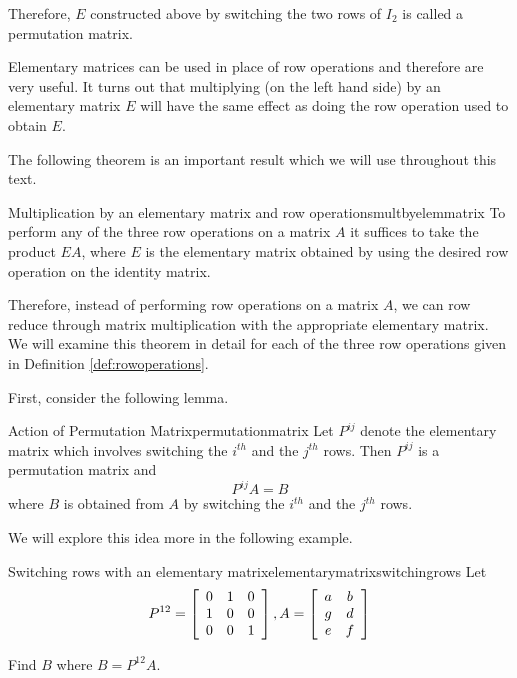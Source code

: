 Therefore, $E$ constructed above by switching the two rows of $I_2$ is called a permutation matrix. 

Elementary matrices can be used in place of row operations and therefore are very useful. It turns
out that multiplying (on the left hand side) by an elementary matrix $E$ will have the
same effect as doing the row operation used to obtain $E$.

The following theorem is an important result which we will use throughout this text. 

\begin{theorem}{Multiplication by an elementary matrix and row operations}{multbyelemmatrix}
To perform any of the three row operations on a matrix $A$
it suffices to take the product $EA$, where $E$ is the elementary matrix obtained by 
using the desired row operation on the identity matrix.
\end{theorem}

Therefore, instead of performing row operations on a matrix $A$, we
can row reduce through matrix multiplication with the appropriate
elementary matrix. We will examine this theorem in detail for each of
the three row operations given in Definition \ref{def:rowoperations}.

First, consider the following lemma.

\begin{lemma}{Action of Permutation Matrix}{permutationmatrix}
Let $P^{ij}$ denote the elementary matrix which involves
switching the $i^{th}$ and the $j^{th}$ rows. Then $P^{ij}$ is a permutation matrix and 
\begin{equation*}
P^{ij}A=B
\end{equation*}
where $B$ is obtained from $A$ by switching the $i^{th}$ and the $j^{th}$
rows.
\end{lemma}

We will explore this idea more in the following example.

\begin{example}{Switching rows with an elementary matrix}{elementarymatrixswitchingrows}
Let
\begin{equation*}
P^{12} = \left[
\begin{array}{rrr}
0 & 1 & 0 \\
1 & 0 & 0 \\
0 & 0 & 1
\end{array}
\right], A = \left[
\begin{array}{cc}
a & b \\
g & d \\
e & f
\end{array}
\right] 
\end{equation*}

Find $B$ where $B = P^{12}A$.
\end{example}

